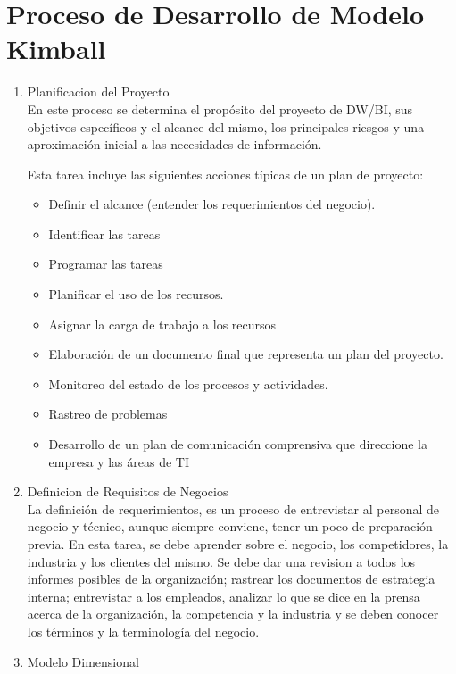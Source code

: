 \documentclass[preprint,12pt]{elsarticle}
\begin{document}
\section{Proceso de Desarrollo de Modelo Kimball}
\begin{enumerate}[4.1]
 \item Planificacion del Proyecto\\

En este proceso se determina el propósito del proyecto de DW/BI, sus objetivos específicos y el alcance del mismo, los principales riesgos y una aproximación inicial a las necesidades de información.

Esta tarea incluye las siguientes acciones típicas de un plan de proyecto:


\begin{itemize}
  \item Definir el alcance (entender los requerimientos del negocio).
  \item Identificar las tareas
\item Programar las tareas
\item Planificar el uso de los recursos.
\item Asignar la carga de trabajo a los recursos
\item Elaboración de un documento final que representa un plan del proyecto.
\item Monitoreo del estado de los procesos y actividades.
\item Rastreo de problemas
\item Desarrollo de un plan de comunicación comprensiva que direccione la empresa y las áreas de TI
\end{itemize} 

\item Definicion de Requisitos de Negocios \\

La definición de requerimientos, es un proceso de entrevistar al personal de negocio y técnico, aunque siempre conviene, tener un poco de preparación previa. En esta tarea, se debe aprender sobre el negocio, los competidores, la industria y los clientes del mismo. Se debe dar una revision a todos los informes posibles de la organización; rastrear los documentos de estrategia interna; entrevistar a los empleados, analizar lo que se dice en la prensa acerca de la organización, la competencia y la industria y se deben conocer los términos y la terminología del negocio.\\
\item Modelo Dimensional \\


\end{enumerate}
\end{document}
